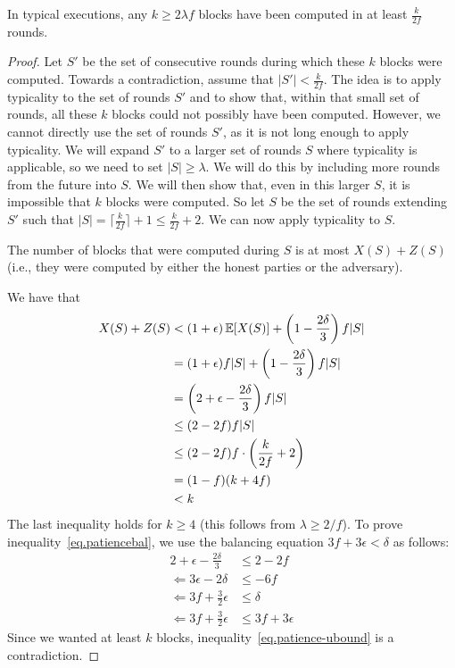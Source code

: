 \begin{lemma}\label{lem.patience}
In typical executions, any $k \geq 2\lambda f$ blocks have been computed in at least $\frac{k}{2f}$ rounds.
\end{lemma}
\begin{proof}
Let $S'$ be the set of consecutive rounds during which these $k$ blocks were computed. Towards a contradiction, assume that $|S'| < \frac{k}{2f}$. The idea is to apply typicality to the set of rounds $S'$ and to show that, within that small set of rounds, all these $k$ blocks could not possibly have been computed. However, we cannot directly use the set of rounds $S'$, as it is not long enough to apply typicality. We will expand $S'$ to a larger set of rounds $S$ where typicality is applicable, so we need to set $|S| \geq \lambda$. We will do this by including more rounds from the future into $S$. We will then show that, even in this larger $S$, it is impossible that $k$ blocks were computed. So let $S$ be the set of rounds extending $S'$ such that $|S| = \lceil \frac{k}{2f} \rceil + 1 \leq \frac{k}{2f} + 2$. We can now apply typicality to $S$.

The number of blocks that were computed during $S$ is at most $X(S) + Z(S)$ (i.e., they were computed by either the honest parties or the adversary).

We have that
\begin{align}
    X(S) + Z(S) &< (1+\epsilon)\operatorname{\mathbb{E}}[X(S)] + \left(1 - \frac{2\delta}{3}\right)f|S|\\
    &=(1+\epsilon)f|S|+ \left(1 - \frac{2\delta}{3}\right)f|S|\\
    &= \left(2 + \epsilon - \frac{2\delta}{3}\right)f|S|\\
    &\leq (2-2f)f|S|\label{eq.patiencebal}\\
    & \leq (2-2f)f \cdot \left(\frac{k}{2f} + 2\right)\\
    & = (1-f)(k+4f) \\
    & < k\label{eq.patience-ubound}
\end{align}
The last inequality holds for $k \geq 4$ (this follows from $\lambda \geq 2/f$).
To prove inequality~\ref{eq.patiencebal}, we use the balancing equation $3f + 3\epsilon < \delta$ as follows:
\begin{align}
  2 + \epsilon - \frac{2\delta}{3} &\leq 2-2f\\
  \Leftarrow 3\epsilon - 2\delta &\leq -6f\\
  \Leftarrow 3f + \frac{3}{2}\epsilon &\leq \delta\\
  \Leftarrow 3f + \frac{3}{2}\epsilon &\leq 3f + 3\epsilon
\end{align}
Since we wanted at least $k$ blocks, inequality~\ref{eq.patience-ubound} is a contradiction.
\end{proof}

